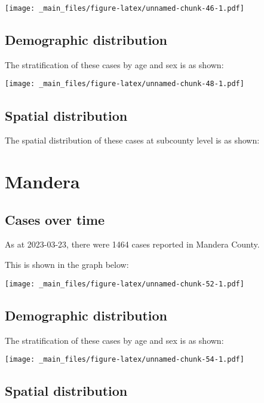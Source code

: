 \documentclass[
]{book}
\begin{document}
\texttt{[image: \_main\_files/figure-latex/unnamed-chunk-46-1.pdf]}

\hypertarget{demographic-distribution-7}{%
\section{Demographic distribution}\label{demographic-distribution-7}}

The stratification of these cases by age and sex is as shown:

\texttt{[image: \_main\_files/figure-latex/unnamed-chunk-48-1.pdf]}

\hypertarget{spatial-distribution-7}{%
\section{Spatial distribution}\label{spatial-distribution-7}}

The spatial distribution of these cases at subcounty level is as shown:

\hypertarget{mandera}{%
\chapter{Mandera}\label{mandera}}

\hypertarget{cases-over-time-8}{%
\section{Cases over time}\label{cases-over-time-8}}

As at 2023-03-23, there were 1464 cases reported in Mandera County.

This is shown in the graph below:

\texttt{[image: \_main\_files/figure-latex/unnamed-chunk-52-1.pdf]}

\hypertarget{demographic-distribution-8}{%
\section{Demographic distribution}\label{demographic-distribution-8}}

The stratification of these cases by age and sex is as shown:

\texttt{[image: \_main\_files/figure-latex/unnamed-chunk-54-1.pdf]}

\hypertarget{spatial-distribution-8}{%
\section{Spatial distribution}\label{spatial-distribution-8}}
\end{document}
